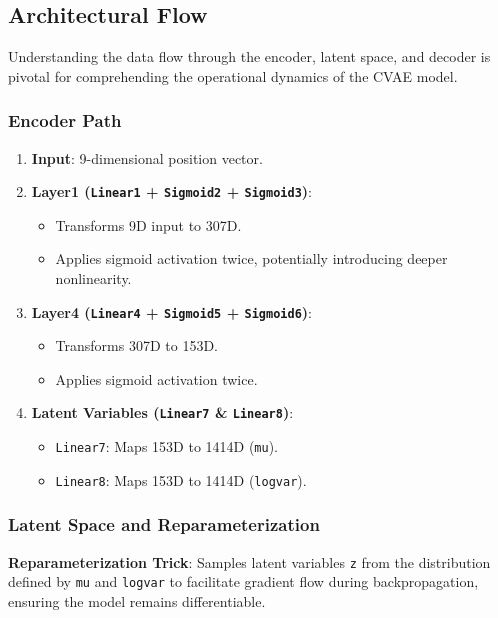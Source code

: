 \documentclass[10pt]{article}
\begin{document}
\subsection{Architectural Flow}

Understanding the data flow through the encoder, latent space, and decoder is pivotal for comprehending the operational dynamics of the CVAE model.

\subsubsection{Encoder Path}

\begin{enumerate}
    \item \textbf{Input}: 9-dimensional position vector.
    \item \textbf{Layer1 (\texttt{Linear1} + \texttt{Sigmoid2} + \texttt{Sigmoid3})}:
    \begin{itemize}
        \item Transforms 9D input to 307D.
        \item Applies sigmoid activation twice, potentially introducing deeper nonlinearity.
    \end{itemize}
    \item \textbf{Layer4 (\texttt{Linear4} + \texttt{Sigmoid5} + \texttt{Sigmoid6})}:
    \begin{itemize}
        \item Transforms 307D to 153D.
        \item Applies sigmoid activation twice.
    \end{itemize}
    \item \textbf{Latent Variables (\texttt{Linear7} \& \texttt{Linear8})}:
    \begin{itemize}
        \item \texttt{Linear7}: Maps 153D to 1414D (\texttt{mu}).
        \item \texttt{Linear8}: Maps 153D to 1414D (\texttt{logvar}).
    \end{itemize}
\end{enumerate}

\subsubsection{Latent Space and Reparameterization}

\textbf{Reparameterization Trick}: Samples latent variables \texttt{z} from the distribution defined by \texttt{mu} and \texttt{logvar} to facilitate gradient flow during backpropagation, ensuring the model remains differentiable.
\end{document}

